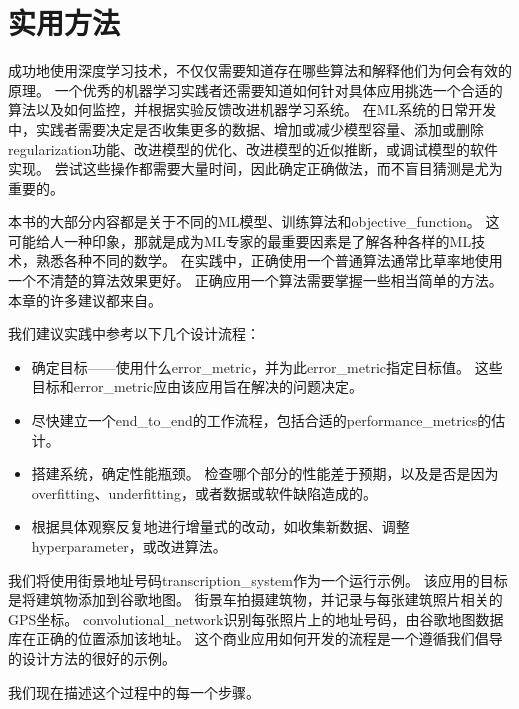 \chapter{实用方法}
\label{chap:practical_methodology}
成功地使用深度学习技术，不仅仅需要知道存在哪些算法和解释他们为何会有效的原理。
一个优秀的机器学习实践者还需要知道如何针对具体应用挑选一个合适的算法以及如何监控，并根据实验反馈改进机器学习系统。
在\gls{ML}系统的日常开发中，实践者需要决定是否收集更多的数据、增加或减少模型容量、添加或删除\gls{regularization}功能、改进模型的优化、改进模型的近似推断，或调试模型的软件实现。
尝试这些操作都需要大量时间，因此确定正确做法，而不盲目猜测是尤为重要的。


本书的大部分内容都是关于不同的\gls{ML}模型、训练算法和\gls{objective_function}。
这可能给人一种印象，那就是成为\gls{ML}专家的最重要因素是了解各种各样的\gls{ML}技术，熟悉各种不同的数学。
在实践中，正确使用一个普通算法通常比草率地使用一个不清楚的算法效果更好。
正确应用一个算法需要掌握一些相当简单的方法。
本章的许多建议都来自\cite{ng-lecture-advice}。


我们建议实践中参考以下几个设计流程：
\begin{itemize}
\item 确定目标——使用什么\gls{error_metric}，并为此\gls{error_metric}指定目标值。
这些目标和\gls{error_metric}应由该应用旨在解决的问题决定。


\item 尽快建立一个\gls{end_to_end}的工作流程，包括合适的\gls{performance_metrics}的估计。

\item 搭建系统，确定性能瓶颈。
检查哪个部分的性能差于预期，以及是否是因为\gls{overfitting}、\gls{underfitting}，或者数据或软件缺陷造成的。

\item 根据具体观察反复地进行增量式的改动，如收集新数据、调整\gls{hyperparameter}，或改进算法。
\end{itemize}


我们将使用街景地址号码\gls{transcription_system}\citep{Goodfellow+et+al-ICLR2014a}作为一个运行示例。
该应用的目标是将建筑物添加到谷歌地图。
街景车拍摄建筑物，并记录与每张建筑照片相关的GPS坐标。
\gls{convolutional_network}识别每张照片上的地址号码，由谷歌地图数据库在正确的位置添加该地址。
这个商业应用如何开发的流程是一个遵循我们倡导的设计方法的很好的示例。

我们现在描述这个过程中的每一个步骤。



